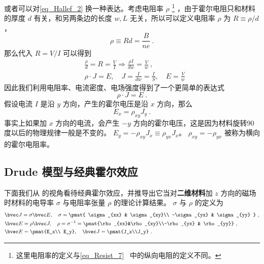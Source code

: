 或者可以对\autoref{eq_Hallef_2} 换一种表达。考虑电阻率 $\rho$
\footnote{这里电阻率的定义与\autoref{eq_Resist_7}~ 中的纵向电阻的定义不同。} ，由于霍尔电阻只和材料的厚度 $d$ 有关，和另两条边的长度 $w,L$ 无关，所以可以定义电阻率 $\rho$ 为 $R\equiv\rho /d$，
\begin{equation}\label{eq_Hallef_3}
\rho\equiv Rd=\frac{B}{ne}~.
\end{equation}
那么代入 $R=V/I$ 可以得到
\begin{equation}
\begin{aligned}
&\frac{\rho }{d} =R= \frac{V}{I}\Rightarrow \frac{\rho I}{dw}=\frac{V}{w}~,\\
&\rho \cdot J = E,\quad J= \frac{I}{dw}=\frac{I}{S},\quad E=\frac{V}{w}
\end{aligned}
\end{equation}
因此我们利用电阻率、电流密度、电场强度得到了一个更简单的表达式
\begin{equation}
\rho\cdot J=E~.
\end{equation}
假设电流 $I$ 是沿 $y$ 方向，产生的霍尔电压是沿 $x$ 方向，那么
\begin{equation}
E_x = \rho_{xy} J_y~.
\end{equation}
事实上如果加 $x$ 方向的电流，会产生 $-y$ 方向的霍尔电压，这是因为材料旋转90度以后的物理规律一般是不变的。 $E_y=-\rho_{xy} J_x\equiv \rho_{yx}J_x$。
$\rho_{xy}=-\rho_{yx}$ 被称为横向的霍尔电阻率。

\subsection{Drude 模型与经典霍尔效应}
下面我们从 的视角看待经典霍尔效应，并推导出它当对\textbf{二维材料}加 $z$ 方向的磁场时材料的电导率 $\sigma$ 与电阻率张量 $\rho$ 的理论计算结果。 $\sigma$ 与 $\rho$ 的定义为
\begin{equation}
\begin{aligned}
&\bvec J=\sigma \bvec E,\quad \sigma=\pmat{
    \sigma_{xx} & \sigma_{xy}\\
    -\sigma_{yx} & \sigma_{yy}
}
~,\\
&\bvec E=\rho \bvec J,\quad \rho = \sigma^{-1} =
\pmat{\rho_{xx}&\rho_{xy}\\-\rho_{yx} & \rho_{yy}}~,\\
&\bvec E=\pmat{E_x\\ E_y},\quad \bvec J = \pmat{J_x\\J_y}~.
\end{aligned}
\end{equation}

